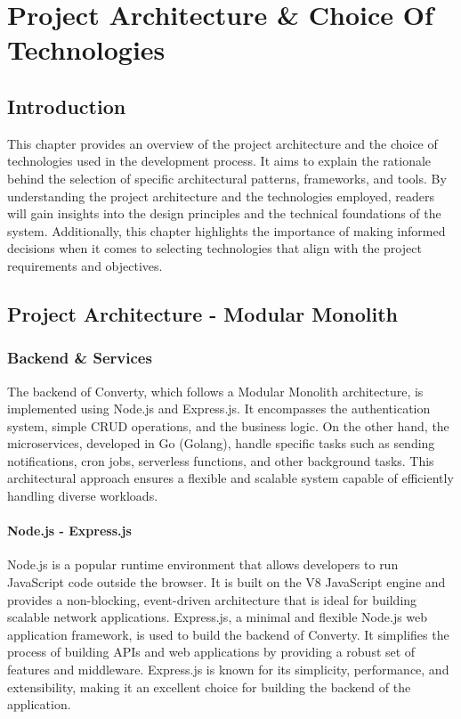 \chapter{Project Architecture \& Choice Of Technologies}
\setcounter{minitocdepth}{1}
\minitoc
\newpage

\section{Introduction}
This chapter provides an overview of the project architecture and the choice of technologies used in the development process. It aims to explain the rationale behind the selection of specific architectural patterns, frameworks, and tools. By understanding the project architecture and the technologies employed, readers will gain insights into the design principles and the technical foundations of the system. Additionally, this chapter highlights the importance of making informed decisions when it comes to selecting technologies that align with the project requirements and objectives.

\section{Project Architecture - Modular Monolith}

\subsection{Backend \& Services}
The backend of Converty, which follows a Modular Monolith architecture, is implemented using Node.js and Express.js. It encompasses the authentication system, simple CRUD operations, and the business logic. On the other hand, the microservices, developed in Go (Golang), handle specific tasks such as sending notifications, cron jobs, serverless functions, and other background tasks. This architectural approach ensures a flexible and scalable system capable of efficiently handling diverse workloads.

\subsubsection{Node.js - Express.js}
Node.js is a popular runtime environment that allows developers to run JavaScript code outside the browser. It is built on the V8 JavaScript engine and provides a non-blocking, event-driven architecture that is ideal for building scalable network applications. Express.js, a minimal and flexible Node.js web application framework, is used to build the backend of Converty. It simplifies the process of building APIs and web applications by providing a robust set of features and middleware. Express.js is known for its simplicity, performance, and extensibility, making it an excellent choice for building the backend of the application.

